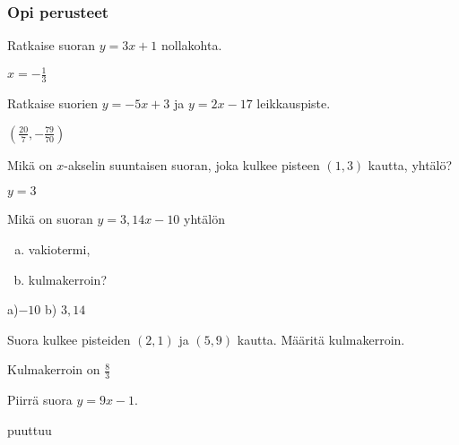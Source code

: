 \begin{tehtavasivu}

\subsubsection*{Opi perusteet}

\begin{tehtava}
Ratkaise suoran $y=3x+1$ nollakohta.
\begin{vastaus}
$x=-\frac{1}{3}$
\end{vastaus}
\end{tehtava}

\begin{tehtava}
Ratkaise suorien $y=-5x+3$ ja $y=2x-17$ leikkauspiste.
\begin{vastaus}
$(\frac{20}{7}, -\frac{79}{70})$
\end{vastaus}
\end{tehtava}

\begin{tehtava}
Mikä on $x$-akselin suuntaisen suoran, joka kulkee pisteen $(1, 3)$ kautta, yhtälö?
\begin{vastaus}
$y=3$
\end{vastaus}
\end{tehtava}

\begin{tehtava}
Mikä on suoran $y=3,14x-10$ yhtälön
\begin{enumerate}[a)]
\item vakiotermi,
\item kulmakerroin?
\end{enumerate}
\begin{vastaus}
a)$-10$ b) $3,14$
\end{vastaus}
\end{tehtava}

\begin{tehtava}
Suora kulkee pisteiden $(2, 1)$ ja $(5, 9)$ kautta. Määritä kulmakerroin.
\begin{vastaus}
Kulmakerroin on $\frac{8}{3}$
\end{vastaus}
\end{tehtava}

\begin{tehtava}
Piirrä suora $y=9x-1$.
\begin{vastaus}
puuttuu
\end{vastaus}
\end{tehtava}


\end{tehtavasivu}
